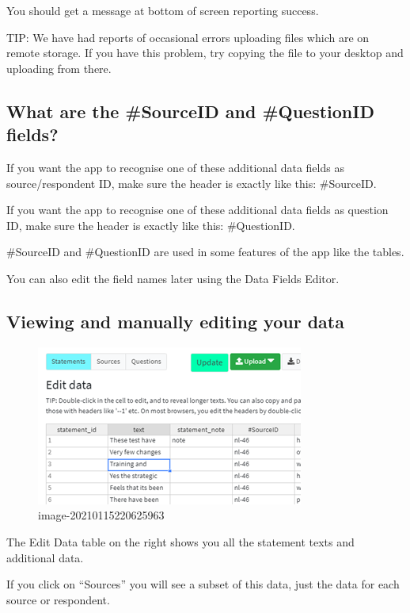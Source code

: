 \documentclass[
]{book}
\begin{document}
You should get a message at bottom of screen reporting success.

TIP: We have had reports of occasional errors uploading files which are on remote storage. If you have this problem, try copying the file to your desktop and uploading from there.

\hypertarget{what-are-the-sourceid-and-questionid-fields}{%
\subsection{What are the \#SourceID and \#QuestionID fields?}\label{what-are-the-sourceid-and-questionid-fields}}

If you want the app to recognise one of these additional data fields as source/respondent ID, make sure the header is exactly like this: \#SourceID.

If you want the app to recognise one of these additional data fields as question ID, make sure the header is exactly like this: \#QuestionID.

\#SourceID and \#QuestionID are used in some features of the app like the tables.

You can also edit the field names later using the Data Fields Editor.

\hypertarget{viewing-and-manually-editing-your-data}{%
\subsection{Viewing and manually editing your data}\label{viewing-and-manually-editing-your-data}}

\begin{figure}
\centering
\includegraphics{_assets/image-20210115220625963.png}
\caption{image-20210115220625963}
\end{figure}

The Edit Data table on the right shows you all the statement texts and additional data.

If you click on ``Sources'' you will see a subset of this data, just the data for each source or respondent.
\end{document}
